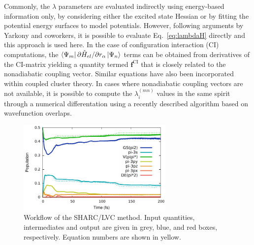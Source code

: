 \documentclass[twoside,twocolumn,9pt]{article}
\begin{document}
Commonly, the $\lambda$ parameters are evaluated indirectly using energy-based information only, by considering either the excited state Hessian\cite{Koppel1984, Leveque2013, Fumanal2016} or by fitting the potential energy surfaces to model potentials.\cite{VCHam, Worth2004}
However, following arguments by Yarkony and coworkers,\cite{Schuurman2007}  it is possible to evaluate Eq.~\eqref{eq:lambdaH} directly and this approach is used here.
In the case of configuration interaction (CI) computations, the $\bra{\Psi_m}\partial \hat{H}_{el}/\partial r_\alpha\ket{\Psi_n}$ terms can be obtained from derivatives of the CI-matrix yielding a quantity termed $\mathbf{f}^{\mathrm{CI}}$ that is closely related to the nonadiabatic coupling vector.\cite{Lischka2004,Schuurman2007}
Similar equations have also been incorporated within coupled cluster theory.\cite{Ichino2009, Tajti2009}
In cases where nonadiabatic coupling vectors are not available, it is possible to compute the $\lambda_i^{(mn)}$ values in the same spirit through a numerical differentation using a recently described algorithm\cite{Fumanal2018JCP} based on wavefunction overlaps.\cite{OV1}

\begin{figure}
\includegraphics[width=3in]{all-pop.pdf}
\caption{Workflow of the SHARC/LVC method. Input quantities, intermediates and output are given in grey, blue, and red boxes, respectively. Equation numbers are shown in yellow.}
\label{fig:flow}
\end{figure}
\end{document}
